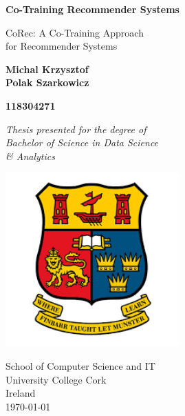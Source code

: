\begin{titlepage}
    \begin{center}
        \vspace*{0.5cm}
        
        \LARGE
        \textbf{Co-Training Recommender Systems}

        \vspace{0.5cm}
        
        \Large
        CoRec: A Co-Training Approach \\ for Recommender Systems
        
        \vspace{1cm}
        
        \textbf{Michal Krzysztof \\ Polak Szarkowicz}
        
        \vspace{0.3cm}
        
        \textbf{118304271}
        
        \vspace{1.8cm}
        
        
        \textit{Thesis presented for the degree of\\
        Bachelor of Science in Data Science\\
        \& Analytics}
        
        \vspace{0.7cm}
        
        \includegraphics[width=0.5\textwidth]{images/ucc_logo.png}
        
        \large
        \vspace{1.2cm}

        School of Computer Science and IT\\
        University College Cork\\
        Ireland\\
        \today
        
        
        \vspace{1cm}
        
    \end{center}
\end{titlepage}

